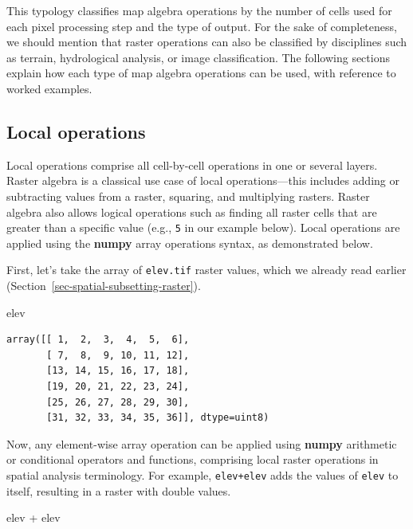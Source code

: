 \documentclass[
  letterpaper,
]{krantz}
\newenvironment{Shaded}{\begin{snugshade}}{\end{snugshade}}
\newcommand{\NormalTok}[1]{\textcolor[rgb]{0.00,0.23,0.31}{#1}}
\newcommand{\OperatorTok}[1]{\textcolor[rgb]{0.37,0.37,0.37}{#1}}
\begin{document}
This typology classifies map algebra operations by the number of cells
used for each pixel processing step and the type of output. For the sake
of completeness, we should mention that raster operations can also be
classified by disciplines such as terrain, hydrological analysis, or
image classification. The following sections explain how each type of
map algebra operations can be used, with reference to worked examples.

\subsection{Local operations}\label{sec-raster-local-operations}

Local operations comprise all cell-by-cell operations in one or several
layers. Raster algebra is a classical use case of local
operations---this includes adding or subtracting values from a raster,
squaring, and multiplying rasters. Raster algebra also allows logical
operations such as finding all raster cells that are greater than a
specific value (e.g., \texttt{5} in our example below). Local operations
are applied using the \textbf{numpy} array operations syntax, as
demonstrated below.

First, let's take the array of \texttt{elev.tif} raster values, which we
already read earlier (Section~\ref{sec-spatial-subsetting-raster}).

\begin{Shaded}
\begin{Highlighting}[]
\NormalTok{elev}
\end{Highlighting}
\end{Shaded}

\begin{verbatim}
array([[ 1,  2,  3,  4,  5,  6],
       [ 7,  8,  9, 10, 11, 12],
       [13, 14, 15, 16, 17, 18],
       [19, 20, 21, 22, 23, 24],
       [25, 26, 27, 28, 29, 30],
       [31, 32, 33, 34, 35, 36]], dtype=uint8)
\end{verbatim}

Now, any element-wise array operation can be applied using
\textbf{numpy} arithmetic or conditional operators and functions,
comprising local raster operations in spatial analysis terminology. For
example, \texttt{elev+elev} adds the values of \texttt{elev} to itself,
resulting in a raster with double values.

\begin{Shaded}
\begin{Highlighting}[]
\NormalTok{elev }\OperatorTok{+}\NormalTok{ elev}
\end{Highlighting}
\end{Shaded}
\end{document}

